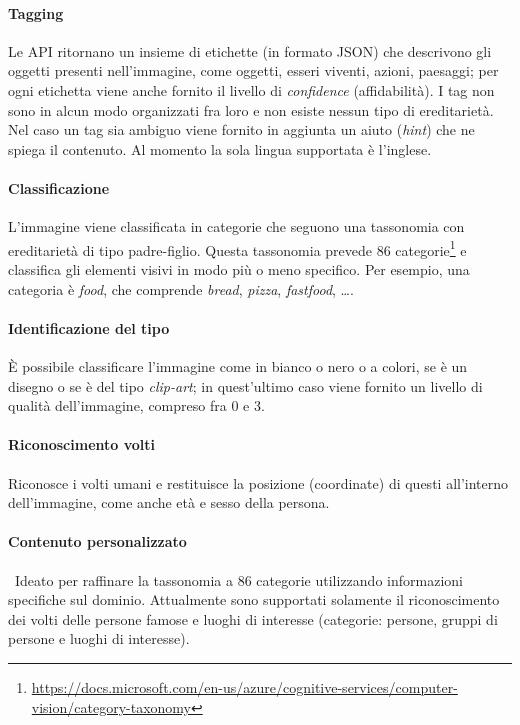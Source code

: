 \paragraph{Tagging} Le API ritornano un insieme di etichette (in formato JSON) che descrivono gli oggetti presenti nell'immagine, come oggetti, esseri viventi, azioni, paesaggi; per ogni etichetta viene anche fornito il livello di \textit{confidence} (affidabilità). I tag non sono in alcun modo organizzati fra loro e non esiste nessun tipo di ereditarietà.
Nel caso un tag sia ambiguo viene fornito in aggiunta un aiuto (\textit{hint}) che ne spiega il contenuto.
Al momento la sola lingua supportata è l'inglese.

\paragraph{Classificazione} L'immagine viene classificata in categorie che seguono una tassonomia con ereditarietà di tipo padre-figlio. Questa tassonomia prevede 86 categorie\footnote{\url{https://docs.microsoft.com/en-us/azure/cognitive-services/computer-vision/category-taxonomy}} e classifica gli elementi visivi in modo più o meno specifico.
Per esempio, una categoria è \textit{food}, che comprende \textit{bread}, \textit{pizza}, \textit{fastfood}, \ldots.

\paragraph{Identificazione del tipo} È possibile classificare l'immagine come in bianco o nero o a colori, se è un disegno o se è del tipo \textit{clip-art}; in quest'ultimo caso viene fornito un livello di qualità dell'immagine, compreso fra 0 e 3.

\paragraph{Riconoscimento volti} Riconosce i volti umani e restituisce la posizione (coordinate) di questi all'interno dell'immagine, come anche età e sesso della persona.

\paragraph{Contenuto personalizzato} Ideato per raffinare la tassonomia a 86 categorie utilizzando informazioni specifiche sul dominio.
Attualmente sono supportati solamente il riconoscimento dei volti delle persone famose e luoghi di interesse
(categorie: persone, gruppi di persone e luoghi di interesse).

